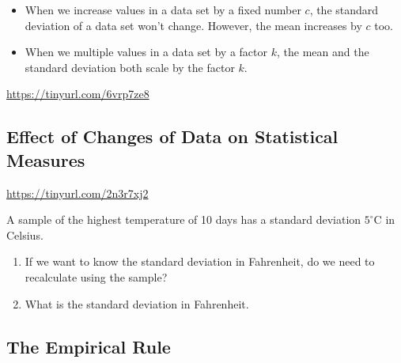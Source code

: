 \begin{itemize}
\item
  When we increase values in a data set by a fixed number \(c\), the
  standard deviation of a data set won't change. However, the mean
  increases by \(c\) too.
\item
  When we multiple values in a data set by a factor \(k\), the mean and
  the standard deviation both scale by the factor \(k\).
\end{itemize}

\url{https://tinyurl.com/6vrp7ze8}

\hypertarget{effect-of-changes-of-data-on-statistical-measures}{%
\subsection{Effect of Changes of Data on Statistical
Measures}\label{effect-of-changes-of-data-on-statistical-measures}}

\url{https://tinyurl.com/2n3r7xj2}

\begin{exercise}

A sample of the highest temperature of 10 days has a standard deviation
\(5^\circ\mathrm{C}\) in Celsius.

\begin{enumerate}
\item
  If we want to know the standard deviation in Fahrenheit, do we need to
  recalculate using the sample?
\item
  What is the standard deviation in Fahrenheit.
\end{enumerate}

\end{exercise}

\hypertarget{the-empirical-rule}{%
\subsection{The Empirical Rule}\label{the-empirical-rule}}

